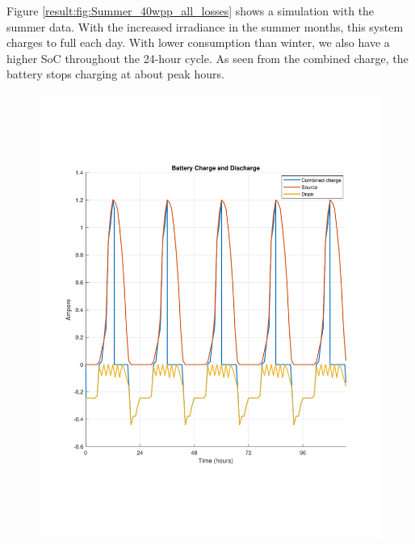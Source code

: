 Figure \ref{result:fig:Summer_40wpp_all_losses} shows a simulation with the summer data. With the increased irradiance in the summer months, this system charges to full each day. With lower consumption than winter, we also have a higher SoC throughout the 24-hour cycle. As seen from the combined charge, the battery stops charging at about peak hours.

\begin{figure}[H]
    \centering
    \begin{minipage}[t]{0.655\textwidth} %
        \centering
        \includegraphics[width=\linewidth]{photos/Summer_charge_with_all_loss_5Days.pdf} %
    \end{minipage}%
    \hspace{0.01\textwidth}%
    \begin{minipage}[t]{0.33\textwidth} %

\end{minipage}
\end{figure}

